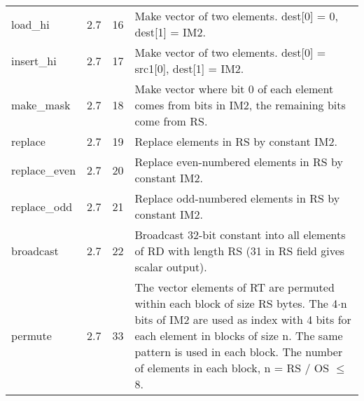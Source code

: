 \documentclass[forwardcom.tex]{subfiles}
\begin{document}
\begin{longtable} {|p{20mm}|p{10mm}|p{8mm}|p{75mm}|}
load\_hi      & 2.7 & 16 & Make vector of two elements. dest[0] = 0, dest[1] = IM2. \\
insert\_hi    & 2.7 & 17 & Make vector of two elements. dest[0] = src1[0], dest[1] = IM2. \\
make\_mask    & 2.7 & 18 & Make vector where bit 0 of each element comes from bits in IM2, the remaining bits come from RS. \\
replace       & 2.7 & 19 & Replace elements in RS by constant IM2. \\
replace\_even & 2.7 & 20 & Replace even-numbered elements in RS by constant
IM2. \\
replace\_odd  & 2.7 & 21 & Replace odd-numbered elements in RS by constant
IM2. \\
broadcast     & 2.7 & 22 & Broadcast 32-bit constant into all elements of RD with length RS (31 in RS field gives scalar output). \\
permute       & 2.7 & 33 & The vector elements of RT are permuted within each block of size RS bytes. The 4$\cdot$n bits of IM2 are used as index with 4 bits for
each element in blocks of size n. The same pattern is used in each
block. The number of elements in each block, n = RS / OS $\leq$ 8. \\
\hline
\end{longtable}
\end{document}
